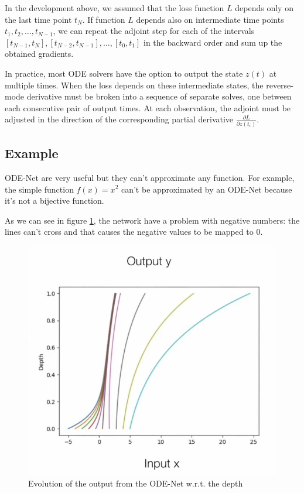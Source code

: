 \documentclass[10pt,a4paper]{article}
\theoremstyle{definition}
\theoremstyle{definition}
\theoremstyle{definition}
\begin{document}
In the development above, we assumed that the loss function $L$ depends only on the last time point $t_N$. If function $L$ depends also on intermediate time points $t_1, t_2, \dots , t_{N-1}$, we can repeat the adjoint step for each of the intervals $[t_{N-1}, t_N ],[t_{N-2}, t_{N-1}], \dots , [t_0,t_1]$ in the backward order and sum up the obtained gradients.

In practice, most ODE solvers have the option to output the state $z(t)$ at multiple times. When the loss depends on these intermediate states, the reverse-mode derivative must be broken into a sequence of separate solves, one between each consecutive pair of output times. At each observation, the adjoint must be adjusted in the direction of the corresponding partial derivative $\frac{\partial L}{\partial z(t_i)}$.


\subsection{Example}

ODE-Net are very useful but they can't approximate any function. 
For example, the simple function $f(x) = x^2$ can't be approximated by an ODE-Net because it's not a bijective function.

As we can see in figure \ref{x2}, the network have a problem with negative numbers: the lines can't cross and that causes the negative values to be mapped to $0$.
\begin{figure}[!h]
\center
\label{x2}
\includegraphics[scale=0.45]{x2graphe.png}
\caption{Evolution of the output from the ODE-Net w.r.t. the depth}
\end{figure}
\end{document}
